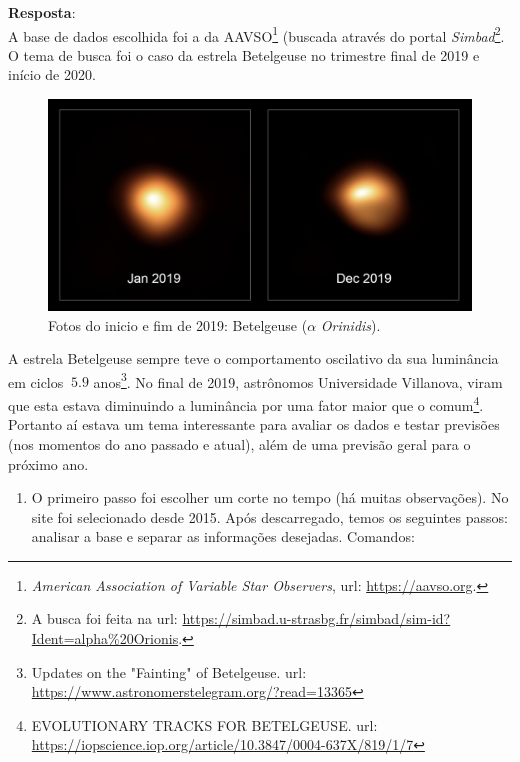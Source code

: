 \documentclass[a4paper,12pt]{article}
\begin{document}
\begin{enumerate}
    \textbf{Resposta}:\\
    A base de dados escolhida foi a da AAVSO\footnote{\textit{American Association of Variable Star Observers}, url: \url{https://aavso.org}.} (buscada através do portal \textit{Simbad}\footnote{A busca foi feita na url: \url{https://simbad.u-strasbg.fr/simbad/sim-id?Ident=alpha\%20Orionis}.}. O tema de busca foi o caso da estrela Betelgeuse no trimestre final de 2019 e início de 2020.\\
                \begin{figure}[h!tb]
                     \centering
                     \includegraphics[scale=0.35]{2_2_ao.jpg}
                     \caption{Fotos do inicio e fim de 2019: Betelgeuse ($\alpha$ \textit{Orinidis}).}
                     \label{fig2all}
                \end{figure}
    A estrela Betelgeuse sempre teve o comportamento oscilativo da sua luminância em ciclos $~ 5.9$ anos\footnote{Updates on the "Fainting" of Betelgeuse. url: \url{https://www.astronomerstelegram.org/?read=13365}}. No final de 2019, astrônomos Universidade Villanova, viram que esta estava diminuindo a luminância por uma fator maior que o comum\footnote{EVOLUTIONARY TRACKS FOR BETELGEUSE. url: \url{https://iopscience.iop.org/article/10.3847/0004-637X/819/1/7}}.\\
    Portanto aí estava um tema interessante para avaliar os dados e testar previsões (nos momentos do ano passado e atual), além de uma previsão geral para o próximo ano.\\
    \begin{enumerate}
        \item O primeiro passo foi escolher um corte no tempo (há muitas observações). No site foi selecionado desde 2015. Após descarregado, temos os seguintes passos: analisar a base e separar as informações desejadas. Comandos:\\

\end{enumerate}
\end{enumerate}
\end{document}
